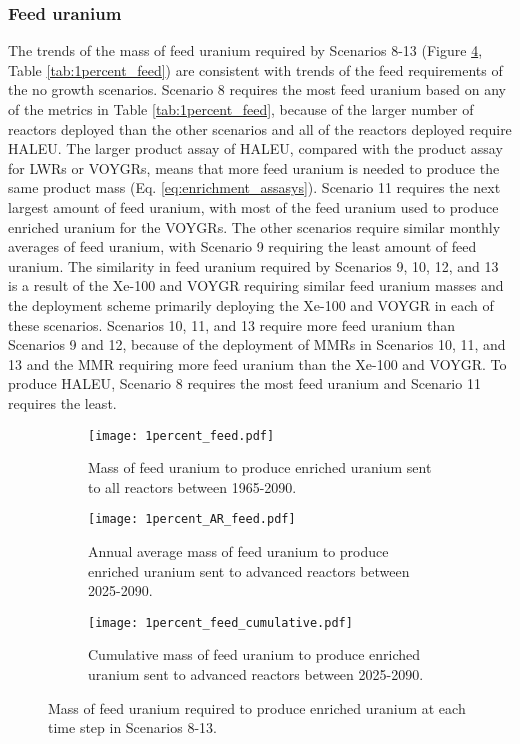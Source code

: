 \subsubsection{Feed uranium}
The trends of the mass of feed uranium required by Scenarios 8-13 
(Figure \ref{fig:1percent_feed},
Table \ref{tab:1percent_feed}) are consistent with trends of the feed 
requirements of the no growth scenarios. Scenario 8 requires the 
most feed uranium based on any of the metrics in Table 
\ref{tab:1percent_feed}, because of the larger number of 
reactors deployed than the other scenarios and all of the reactors deployed 
require \gls{HALEU}. The larger product assay of \gls{HALEU}, compared with 
the product assay for \glspl{LWR} or VOYGRs, means that more 
feed uranium is needed to produce the same product mass (Eq. 
\ref{eq:enrichment_assasys}). Scenario 11 requires the next largest amount 
of feed uranium, with most of the feed uranium used to produce enriched 
uranium for the VOYGRs. The other scenarios require similar monthly 
averages of feed uranium, with Scenario 9 requiring the least amount of 
feed uranium. The similarity in feed uranium required by Scenarios 9, 10, 12, 
and 13 is a result of the Xe-100 and VOYGR requiring similar feed uranium masses 
and the deployment scheme primarily deploying the Xe-100 and VOYGR in each of 
these scenarios. Scenarios 10, 11, and 13 require more feed 
uranium than Scenarios 9 and 12, because of the deployment of \glspl{MMR} 
in Scenarios 10, 11, and 13 and the \gls{MMR} requiring more feed uranium than 
the Xe-100 and VOYGR. To produce \gls{HALEU}, Scenario 8 requires the most 
feed uranium and Scenario 11 requires the least.  

\begin{figure}[h!]
    \centering
    \begin{subfigure}[b]{0.45\textwidth}
        \centering
        \texttt{[image: 1percent\_feed.pdf]}
        \caption{Mass of feed uranium to produce enriched uranium sent to 
        all reactors between 1965-2090.}
        \label{fig:1percent_all_feed}
    \end{subfigure}
    \hfill
    \begin{subfigure}[b]{0.45\textwidth}
        \centering
        \texttt{[image: 1percent\_AR\_feed.pdf]}
        \caption{Annual average mass of feed uranium to produce enriched 
        uranium sent to advanced reactors between 2025-2090.}
        \label{fig:1percent_AR_feed}
    \end{subfigure}
    \begin{subfigure}[b]{0.45\textwidth}
        \centering
        \texttt{[image: 1percent\_feed\_cumulative.pdf]}
        \caption{Cumulative mass of feed uranium to produce enriched uranium sent to 
        advanced reactors between 2025-2090.}
        \label{fig:1percent_feed_cumulative}
    \end{subfigure}
       \caption{Mass of feed uranium required to produce enriched uranium
       at each time step in Scenarios 8-13.}
       \label{fig:1percent_feed}
\end{figure}

